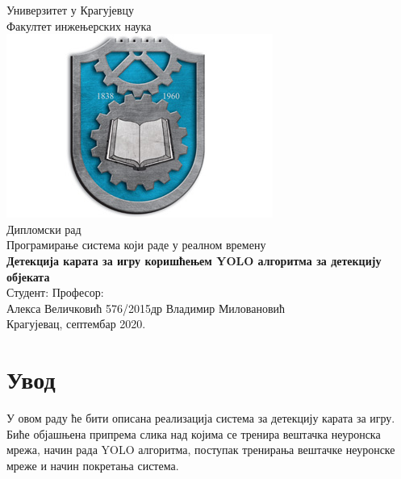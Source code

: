 \documentclass[12pt, а4paper]{article}
\begin{document}
{}

\begin{titlepage}
\center
\Large
Универзитет у Крагујевцу\\
Факултет инжењерских наука\\
\vspace{0.8cm}
\includegraphics[scale=0.5]{slike/grb}\\
\vspace{0.8cm}
Дипломски рад\\
Програмирање система који раде у реалном времену\\
\vspace{1.7cm}
\Huge
\textbf{Детекција карата за игру коришћењем YOLO алгоритма за детекцију објеката}\\
\vfill
\large
\flushleft Студент: \hfill Професор:\\
\vspace{0.1cm}
Алекса Величковић 576/2015\hfill др Владимир Миловановић\\
\vspace{1.3cm}
\center
Крагујевац, септембар 2020.\\
\end{titlepage}

\tableofcontents
\newpage

\section{Увод}
У овом раду ће бити описана реализација система за детекцију карата за игру.
Биће објашњена припрема слика над којима се тренира вештачка неуронска мрежа, 
начин рада YOLO алгоритма,
поступак тренирања вештачке неуронске мреже и начин покретања система.
\end{document}
